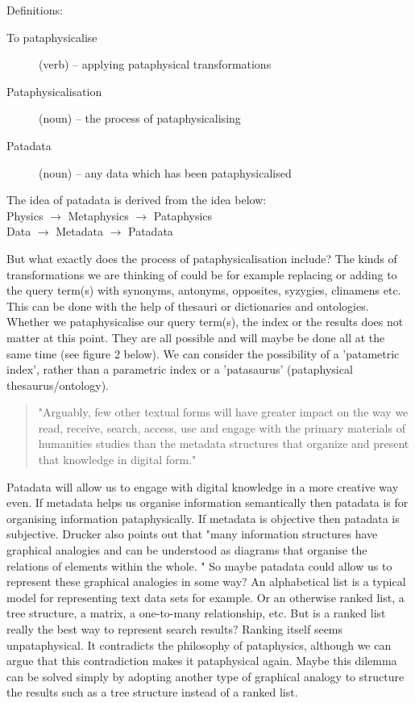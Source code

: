 Definitions:
\begin{description}
  \item [To pataphysicalise] (verb) – applying pataphysical transformations
  \item [Pataphysicalisation] (noun) – the process of pataphysicalising
  \item [Patadata] (noun) – any data which has been pataphysicalised
\end{description}

The idea of patadata is derived from the idea below:\\
Physics $\to$ Metaphysics $\to$ Pataphysics\\
Data $\to$ Metadata $\to$ Patadata

But what exactly does the process of pataphysicalisation include? The kinds of transformations we are thinking of could be for example replacing or adding to the query term(s) with synonyms, antonyms, opposites, syzygies, clinamens etc. This can be done with the help of thesauri or dictionaries and ontologies. Whether we pataphysicalise our query term(s), the index or the results does not matter at this point. They are all possible and will maybe be done all at the same time (see figure 2 below). We can consider the possibility of a 'patametric index', rather than a parametric index or a 'patasaurus' (pataphysical thesaurus/ontology).

\begin{quote}
  "Arguably, few other textual forms will have greater impact on the way we read, receive, search, access, use and engage with the primary materials of humanities studies than the metadata structures that organize and present that knowledge in digital form." \citep[p.9]{Drucker2009}
\end{quote}

Patadata will allow us to engage with digital knowledge in a more creative way even.  If metadata helps us organise information semantically then patadata is for organising information pataphysically. If metadata is objective then patadata is subjective. Drucker also points out that "many information structures have graphical analogies and can be understood as diagrams that organise the relations of elements within the whole. " \citep[p.16]{Drucker2009} So maybe patadata could allow us to represent these graphical analogies in some way? An alphabetical list is a typical model for representing text data sets for example. Or an otherwise ranked list, a tree structure, a matrix, a one-to-many relationship, etc. But is a ranked list really the best way to represent search results? Ranking itself seems unpataphysical. It contradicts the philosophy of pataphysics, although we can argue that this contradiction makes it pataphysical again. Maybe this dilemma can be solved simply by adopting another type of graphical analogy to structure the results such as a tree structure instead of a ranked list.

